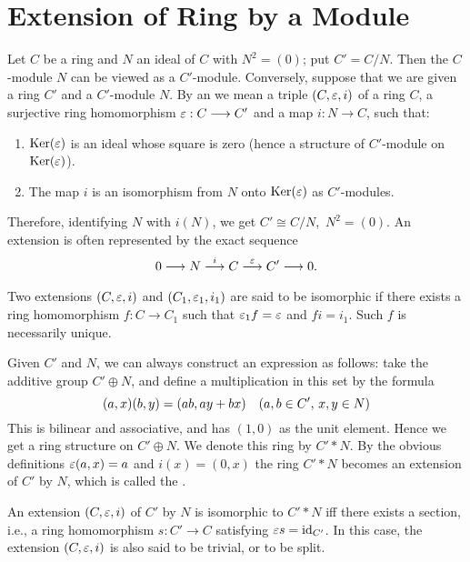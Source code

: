 \documentclass[../main]{subfiles}
\begin{document}
\section{Extension of Ring by a Module}\label{sec:25}

\newparagraph
Let $C$ be a ring and $N$ an ideal of $C$ with $N^2=(0)$; put $C'=C/N$. Then the $C$-module $N$ can be viewed as a $C'$-module. Conversely, suppose that we are given a ring $C'$ and a $C'$-module $N$. By an  we mean a triple $(C,\varepsilon,i)$ of a ring $C$, a surjective ring homomorphism $\varepsilon:C\longrightarrow C'$ and a map $i:N\longrightarrow C$, such that:
\begin{enumerate}
    \item $\operatorname{Ker}(\varepsilon)$ is an ideal whose square is zero (hence a structure of $C'$-module on $\operatorname{Ker}(\varepsilon)$).
    \item The map $i$ is an isomorphism from $N$ onto $\operatorname{Ker}(\varepsilon)$ as $C'$-modules.
\end{enumerate}
Therefore, identifying $N$ with $i(N)$, we get $C'\cong C/N$, $\, N^2=(0)$. An extension is often represented by the exact sequence \[0\longrightarrow N\varrightarrow iC\varrightarrow\ep C'\longrightarrow0.\] Two extensions $(C,\varepsilon,i)$ and $(C_1,\varepsilon_1,i_1)$ are said to be isomorphic if there exists a ring homomorphism $f:C\longrightarrow C_1$ such that $\varepsilon_1f=\varepsilon$ and $fi=i_1$. Such $f$ is necessarily unique.

\newparagraph
Given $C'$ and $N$, we can always construct an expression as follows: take the additive group $C'\oplus N$, and define a multiplication in this set by the formula
\[(a,x)(b,y) = (ab,ay+bx)
\for{a,b\in C',\,x,y\in N}\]
This is bilinear and associative, and has $(1,0)$ as the unit element. Hence we get a ring structure on $C'\oplus N$. We denote this ring by $C'* N$. By the obvious definitions $\varepsilon(a,x) = a$ and $i(x) = (0,x)$ the ring $C'*N$ becomes an extension of $C'$ by $N$, which is called the .

An extension $(C,\varepsilon,i)$ of $C'$ by $N$ is isomorphic to $C'*N$ iff there exists a section, i.e., a ring homomorphism $s:C'\longrightarrow C$ satisfying $\varepsilon s=\operatorname{id}_{C'}$. In this case, the extension $(C,\varepsilon,i)$ is also said to be trivial, or to be split.
\end{document}
